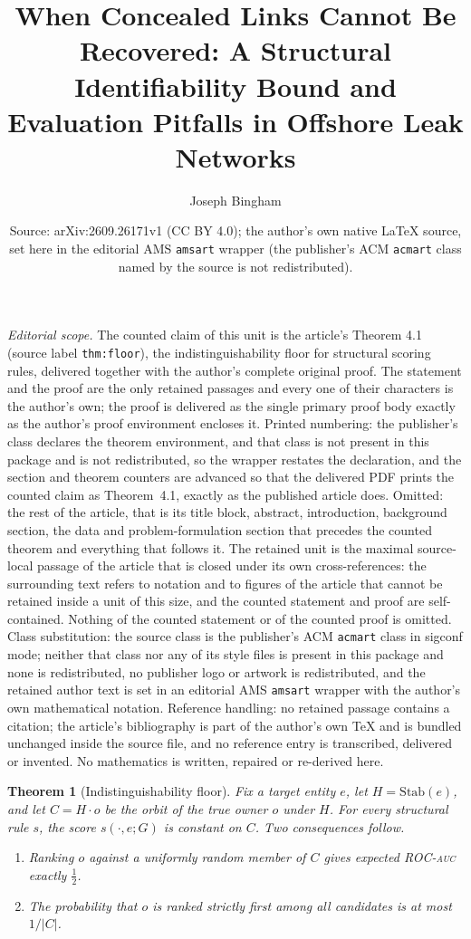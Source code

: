 \documentclass[10pt,a4paper]{amsart}
\title{When Concealed Links Cannot Be Recovered: A Structural Identifiability Bound and Evaluation Pitfalls in Offshore Leak Networks}
\author{Joseph Bingham}
\date{Source: arXiv:2609.26171v1 (CC BY 4.0); the author's own native \LaTeX{} source, set here in the editorial AMS \texttt{amsart} wrapper (the publisher's ACM \texttt{acmart} class named by the source is not redistributed).}
\theoremstyle{plain}
\newtheorem{theorem}{Theorem}[section]
\theoremstyle{definition}
\theoremstyle{remark}
\begin{document}
\maketitle
\noindent\textit{Editorial scope.} The counted claim of this unit is the article's Theorem 4.1 (source label \texttt{thm:floor}), the indistinguishability floor for structural scoring rules, delivered together with the author's complete original proof. The statement and the proof are the only retained passages and every one of their characters is the author's own; the proof is delivered as the single primary proof body exactly as the author's proof environment encloses it. Printed numbering: the publisher's class declares the theorem environment, and that class is not present in this package and is not redistributed, so the wrapper restates the declaration, and the section and theorem counters are advanced so that the delivered PDF prints the counted claim as Theorem~4.1, exactly as the published article does. Omitted: the rest of the article, that is its title block, abstract, introduction, background section, the data and problem-formulation section that precedes the counted theorem and everything that follows it. The retained unit is the maximal source-local passage of the article that is closed under its own cross-references: the surrounding text refers to notation and to figures of the article that cannot be retained inside a unit of this size, and the counted statement and proof are self-contained. Nothing of the counted statement or of the counted proof is omitted. Class substitution: the source class is the publisher's ACM \texttt{acmart} class in sigconf mode; neither that class nor any of its style files is present in this package and none is redistributed, no publisher logo or artwork is redistributed, and the retained author text is set in an editorial AMS \texttt{amsart} wrapper with the author's own mathematical notation. Reference handling: no retained passage contains a citation; the article's bibliography is part of the author's own TeX and is bundled unchanged inside the source file, and no reference entry is transcribed, delivered or invented. No mathematics is written, repaired or re-derived here.

\setcounter{section}{4}
\setcounter{theorem}{0}
\begin{theorem}[Indistinguishability floor]\label{thm:floor}
Fix a target entity $e$, let $H=\mathrm{Stab}(e)$, and let $C=H\!\cdot\!o$ be the
orbit of the true owner $o$ under $H$. For every structural rule $s$, the score
$s(\cdot,e;G)$ is constant on $C$. Two consequences follow.
\begin{enumerate}
\item[(i)] Ranking $o$ against a uniformly random member of $C$ gives expected
ROC-\textsc{auc} exactly $\tfrac12$.
\item[(ii)] The probability that $o$ is ranked strictly first among all
candidates is at most $1/|C|$.
\end{enumerate}
\end{theorem}
\end{document}
